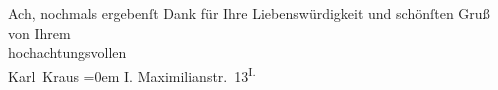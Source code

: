 \begin{ledgroupsized}[t]{13cm}
           \pstart
           Ach, nochmals ergebenſt Dank für Ihre Liebenswürdigkeit und schönſten Gruß\pend
           \pstart
           von Ihrem{\\[\baselineskip]}hochachtungsvollen{\\[\baselineskip]}\spacefill\mbox{Karl Kraus}\pend
           \leftskip=0em{}\pstart
           \noindent{}I. Maximilianstr. 13\textsuperscript{I.}\pend
           \endnumbering{}\end{ledgroupsized}  \newcommand{\dateiname}{L00130}\newcommand{\titel}{Karl Kraus an Arthur Schnitzler, 31. 10. 1892}\newcommand{\editorInnen}{Martin Anton Müller und Gerd-Hermann Susen}
      